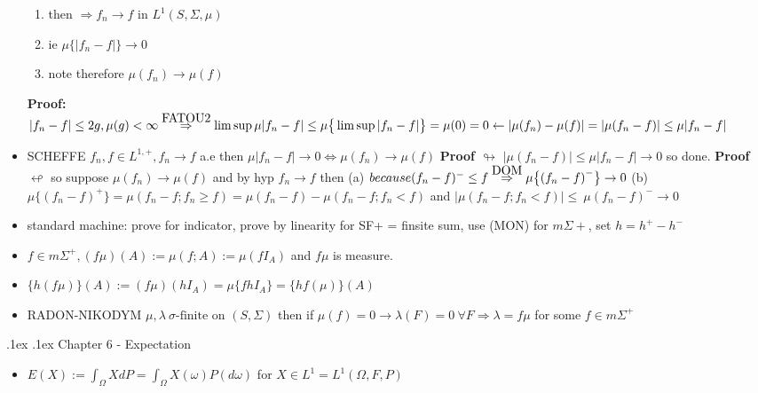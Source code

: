 \documentclass[10pt,landscape,a4paper]{article}
\makeatletter
\renewcommand{\section}{\@startsection{section}{1}{0mm}%
                                {.1ex}%
                                {.1ex}%
                                {\color{blue}\sffamily\small\bfseries}}
\newcommand\myright[1]{\stackrel{{\normalfont\mbox{#1}}}{ \Rightarrow }}
\newcommand{\myblp}{ \big \{ }
\newcommand{\mybrp}{ \big \} }
\makeatother
\begin{document}
\begin{multicols*}{3}
\begin{spacing}{0.5}
\begin{itemize}
\begin{enumerate}
\item then  $\Rightarrow f_n \rightarrow f \text{ in } L^1 (S,\Sigma,\mu) $ 
\item ie $\mu \big \{ |f_n - f| \big \} \rightarrow 0$ 
\item  note therefore $\mu(f_n) \rightarrow \mu(f)  $  
\end{enumerate}

\textbf{Proof:} $|f_n - f| \le 2g , \mu(g) < \infty \myright{FATOU2} \limsup \mu |f_n -f| \le \mu \big \{ \limsup |f_n -f| \big \} = \mu(0) = 0 \leftarrow |\mu(f_n) -\mu(f)| = | \mu(f_n-f)| \le \mu |f_n -f| $ 

\item  \colorbox{red!10}{SCHEFFE} $ f_n,f \in L^{1,+}, f_n \rightarrow f$ a.e then $\mu |f_n-f| \rightarrow 0  \Leftrightarrow \mu(f_n) \rightarrow \mu(f)$ \textbf{Proof $\looparrowright$} $ |\mu(f_n-f)| \le \mu|f_n-f| \rightarrow 0$ so done. \textbf{Proof} $\looparrowleft$ so suppose $\mu(f_n) \rightarrow \mu(f)$ and by hyp $f_n \rightarrow f$ then (a) $because (f_n-f)^- \le f \myright{DOM} \mu \big \{ {(f_n-f)}^- \big \}\rightarrow 0$ (b) \( \mu \myblp {(f_n-f) }^+ \mybrp = \mu  (f_n-f;f_n \ge f) = \mu(f_n-f) - \mu(f_n-f;f_n<f) \) and $  | \mu(f_n-f;f_n<f) | \le \ \mu{(f_n-f)}^- \rightarrow 0 $

\item standard machine: prove for indicator, prove by linearity  for SF+ = finsite sum, use (MON) for $m\Sigma+$, set $h=h^+ - h^-$

\item $ f \in m\Sigma^+, (f\mu)(A) := \mu(f;A) := \mu(fI_A)$ and $f\mu$ is  measure.
\item $\big \{ h(f\mu) \big \} (A) := (f\mu)(hI_A) =\mu \{ fhI_A \} = \big \{ hf(\mu) \big \} (A) $
\item \colorbox{red!10}{RADON-NIKODYM} $\mu,\lambda\ \sigma\text{-finite on } (S,\Sigma) $ then if $\mu(f)=0 \rightarrow \lambda(F)=0\ \forall F \Rightarrow \lambda = f\mu$ for some $f \in m\Sigma^+$

\end{itemize}

\section{Chapter 6 - Expectation}

\begin{itemize}
\item $E(X) := \int_{\Omega} XdP = \int_{\Omega} X(\omega) P(d\omega)$ for $X \in L^1=L^1(\Omega,F,P)$


\end{itemize}
\end{spacing}
\end{multicols*}
\end{document}
